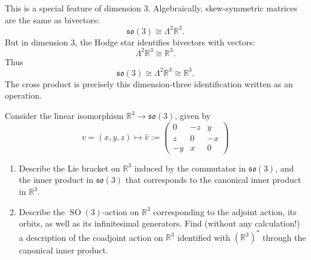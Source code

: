 \medskip\noindent
This is a special feature of dimension $3$.
Algebraically, skew-symmetric matrices are the
same as bivectors:
$$
\mathfrak{so}(3)\cong \Lambda^2\mathbb R^3.
$$
But in dimension $3$, the Hodge star
identifies bivectors with vectors:
$$
\Lambda^2\mathbb R^3\cong\mathbb R^3.
$$
Thus
$$
\mathfrak{so}(3)
\cong
\Lambda^2\mathbb R^3
\cong
\mathbb R^3.
$$
The cross product is precisely this
dimension-three identification written as an
operation.


\begin{exercise}
\label{exercise-so3-adjoint-action}
Consider the linear isomorphism
$\mathbb{R}^3\to\mathfrak{so}(3)$, given by
$$
v=(x,y,z)\mapsto \hat v:=
\begin{pmatrix}
0&-z&y\\
z&0&-x\\
-y&x&0
\end{pmatrix}
$$

\begin{enumerate}
\item Describe the Lie bracket on
$\mathbb{R}^3$ induced by the commutator in
$\mathfrak{so}(3)$, and the inner product in
$\mathfrak{so}(3)$ that corresponds to the
canonical inner product in $\mathbb{R}^3$.

\item Describe the
$\operatorname{SO}(3)$-action on
$\mathbb{R}^3$ corresponding to the adjoint
action, its orbits, as well as its
infinitesimal generators. Find (without any
calculation!) a description of the coadjoint
action on $\mathbb{R}^3$ identified with
$(\mathbb{R}^3)^*$ through the canonical
inner product.
\end{enumerate}
\end{exercise}

